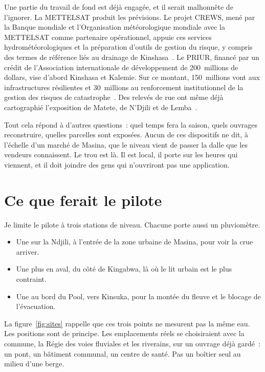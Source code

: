 \documentclass[12pt,a4paper]{article}
\begin{document}
Une partie du travail de fond est déjà engagée, et il serait malhonnête de l'ignorer. La METTELSAT produit les prévisions. Le projet CREWS, mené par la Banque mondiale et l'Organisation météorologique mondiale avec la METTELSAT comme partenaire opérationnel, appuie ces services hydrométéorologiques et la préparation d'outils de gestion du risque, y compris des termes de référence liés au drainage de Kinshasa~\cite{crews2025}. Le PRIUR, financé par un crédit de l'Association internationale de développement de 200~millions de dollars, vise d'abord Kinshasa et Kalemie. Sur ce montant, 150~millions vont aux infrastructures résilientes et 30~millions au renforcement institutionnel de la gestion des risques de catastrophe~\cite{priur2026}. Des relevés de rue ont même déjà cartographié l'exposition de Matete, de N'Djili et de Lemba~\cite{bm2020}.

Tout cela répond à d'autres questions~: quel temps fera la saison, quels ouvrages reconstruire, quelles parcelles sont exposées. Aucun de ces dispositifs ne dit, à l'échelle d'un marché de Masina, que le niveau vient de passer la dalle que les vendeurs connaissent. Le trou est là. Il est local, il porte sur les heures qui viennent, et il doit joindre des gens qui n'ouvriront pas une application.

\section{Ce que ferait le pilote}
\label{sec:pilote}

Je limite le pilote à trois stations de niveau. Chacune porte aussi un pluviomètre.

\begin{itemize}
  \item Une sur la Ndjili, à l'entrée de la zone urbaine de Masina, pour voir la crue arriver.
  \item Une plus en aval, du côté de Kingabwa, là où le lit urbain est le plus contraint.
  \item Une au bord du Pool, vers Kinsuka, pour la montée du fleuve et le blocage de l'évacuation.
\end{itemize}

La figure~\ref{fig:sites} rappelle que ces trois points ne mesurent pas la même eau. Les positions sont de principe. Les emplacements réels se choisiraient avec la commune, la Régie des voies fluviales et les riverains, sur un ouvrage déjà gardé~: un pont, un bâtiment communal, un centre de santé. Pas un boîtier seul au milieu d'une berge.
\end{document}
